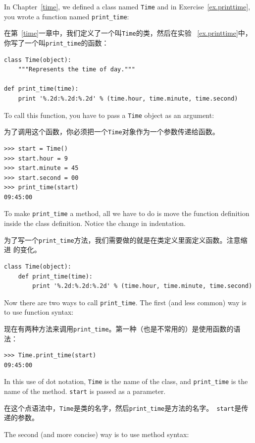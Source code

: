 \documentclass[10pt]{book}
\begin{document}
\begin{CJK}{UTF8}{gbsn}
In Chapter~\ref{time}, we defined a class named
{\tt Time} and in Exercise~\ref{ex.printtime}, you 
wrote a function named \verb"print_time":

在第~\ref{time}一章中，我们定义了一个叫{\tt Time}的类，然后在实验
~\ref{ex.printtime}中，你写了一个叫\verb"print_time"的函数：

\begin{verbatim}
class Time(object):
    """Represents the time of day."""

def print_time(time):
    print '%.2d:%.2d:%.2d' % (time.hour, time.minute, time.second)
\end{verbatim}
%
To call this function, you have to pass a {\tt Time} object as an
argument:

为了调用这个函数，你必须把一个{\tt Time}对象作为一个参数传递给函数。

\begin{verbatim}
>>> start = Time()
>>> start.hour = 9
>>> start.minute = 45
>>> start.second = 00
>>> print_time(start)
09:45:00
\end{verbatim}
%
To make \verb"print_time" a method, all we have to do is
move the function definition inside the class definition.  Notice
the change in indentation.

为了写一个\verb"print_time"方法，我们需要做的就是在类定义里面定义函数。注意缩进
的变化。

\begin{verbatim}
class Time(object):
    def print_time(time):
        print '%.2d:%.2d:%.2d' % (time.hour, time.minute, time.second)
\end{verbatim}
%
Now there are two ways to call \verb"print_time".  The first
(and less common) way is to use function syntax:

现在有两种方法来调用\verb"print_time"。第一种（也是不常用的）是使用函数的语法：


\begin{verbatim}
>>> Time.print_time(start)
09:45:00
\end{verbatim}
%
In this use of dot notation, {\tt Time} is the name of the class,
and \verb"print_time" is the name of the method.  {\tt start} is
passed as a parameter.

在这个点语法中，{\tt Time}是类的名字，然后\verb"print_time"是方法的名字。{\tt
start}是传递的参数。

The second (and more concise) way is to use method syntax:


\end{CJK}
\end{document}
